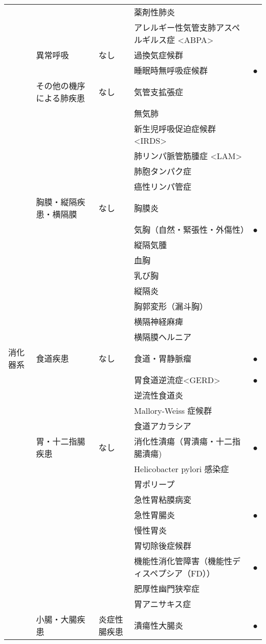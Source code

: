 \begin{xltabular}{\linewidth}{XXXXX}
 &  &  & 薬剤性肺炎 &  \\
 &  &  & アレルギー性気管支肺アスペルギルス症 <ABPA> &  \\
 & 異常呼吸 & なし & 過換気症候群 &  \\
 &  &  & 睡眠時無呼吸症候群 & ● \\
 & その他の機序による肺疾患 & なし & 気管支拡張症 &  \\
 &  &  & 無気肺 &  \\
 &  &  & 新生児呼吸促迫症候群 <IRDS> &  \\
 &  &  & 肺リンパ脈管筋腫症 <LAM> &  \\
 &  &  & 肺胞タンパク症 &  \\
 &  &  & 癌性リンパ管症 &  \\
 & 胸膜・縦隔疾患・横隔膜 & なし & 胸膜炎 &  \\
 &  &  & 気胸（自然・緊張性・外傷性） & ● \\
 &  &  & 縦隔気腫 &  \\
 &  &  & 血胸 &  \\
 &  &  & 乳び胸 &  \\
 &  &  & 縦隔炎 &  \\
 &  &  & 胸郭変形（漏斗胸） &  \\
 &  &  & 横隔神経麻痺 &  \\
 &  &  & 横隔膜ヘルニア &  \\
消化器系 & 食道疾患 & なし & 食道・胃静脈瘤 & ● \\
 &  &  & 胃食道逆流症<GERD>  & ● \\
 &  &  & 逆流性食道炎 &  \\
 &  &  & Mallory-Weiss 症候群 &  \\
 &  &  & 食道アカラシア &  \\
 & 胃・十二指腸疾患 & なし & 消化性潰瘍（胃潰瘍・十二指腸潰瘍) & ● \\
 &  &  & Helicobacter pylori 感染症 &  \\
 &  &  & 胃ポリープ &  \\
 &  &  & 急性胃粘膜病変 &  \\
 &  &  & 急性胃腸炎 & ● \\
 &  &  & 慢性胃炎 &  \\
 &  &  & 胃切除後症候群 &  \\
 &  &  & 機能性消化管障害（機能性ディスペプシア（FD）） & ● \\
 &  &  & 肥厚性幽門狭窄症 &  \\
 &  &  & 胃アニサキス症 &  \\
 & 小腸・大腸疾患 & 炎症性腸疾患 & 潰瘍性大腸炎 & ● \\

\end{xltabular}
